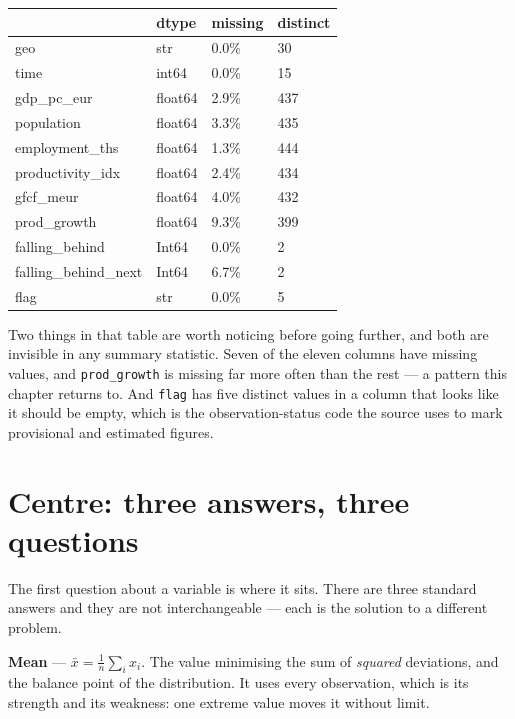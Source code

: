 \documentclass[
  letterpaper,
  10pt,
  twoside,
  openright,
  numbers=noenddot,
  chapterprefix=true]{scrbook}
\begin{document}
\label{view-core-2}
\begin{longtable}[]{@{}llll@{}}
\toprule\noalign{}
& dtype & missing & distinct \\
\midrule\noalign{}
\endhead
\bottomrule\noalign{}
\endlastfoot
geo & str & 0.0\% & 30 \\
time & int64 & 0.0\% & 15 \\
gdp\_pc\_eur & float64 & 2.9\% & 437 \\
population & float64 & 3.3\% & 435 \\
employment\_ths & float64 & 1.3\% & 444 \\
productivity\_idx & float64 & 2.4\% & 434 \\
gfcf\_meur & float64 & 4.0\% & 432 \\
prod\_growth & float64 & 9.3\% & 399 \\
falling\_behind & Int64 & 0.0\% & 2 \\
falling\_behind\_next & Int64 & 6.7\% & 2 \\
flag & str & 0.0\% & 5 \\
\end{longtable}

Two things in that table are worth noticing before going further, and
both are invisible in any summary statistic. Seven of the eleven columns
have missing values, and \texttt{prod\_growth} is missing far more often
than the rest --- a pattern this chapter returns to. And \texttt{flag}
has five distinct values in a column that looks like it should be empty,
which is the observation-status code the source uses to mark provisional
and estimated figures.

\section{Centre: three answers, three
questions}\label{centre-three-answers-three-questions}

The first question about a variable is where it sits. There are three
standard answers and they are not interchangeable --- each is the
solution to a different problem.

\begin{qmibdefinition}

{\textbf{Mean}} --- \(\bar x = \frac1n \sum_i x_i\). The value
minimising the sum of \emph{squared} deviations, and the balance point
of the distribution. It uses every observation, which is its strength
and its weakness: one extreme value moves it without limit.

\end{qmibdefinition}
\end{document}
